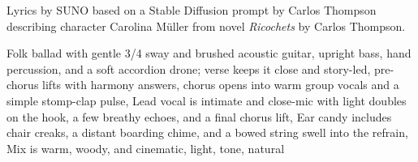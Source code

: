 
\begin{notes}
Lyrics by SUNO based on a Stable Diffusion prompt by Carlos Thompson describing character Carolina Müller from novel \emph{Ricochets} by Carlos Thompson.
\end{notes}
\begin{style}
Folk ballad with gentle 3/4 sway and brushed acoustic guitar, upright bass, hand percussion, and a soft accordion drone; verse keeps it close and story-led, pre-chorus lifts with harmony answers, chorus opens into warm group vocals and a simple stomp-clap pulse, Lead vocal is intimate and close-mic with light doubles on the hook, a few breathy echoes, and a final chorus lift, Ear candy includes chair creaks, a distant boarding chime, and a bowed string swell into the refrain, Mix is warm, woody, and cinematic, light, tone, natural
\end{style}
